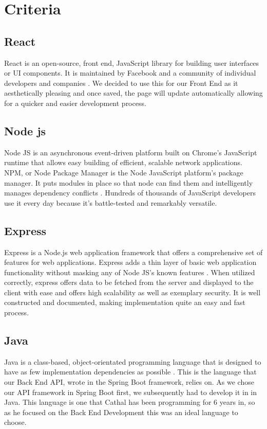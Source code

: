 \section{Criteria}
\subsection{React}
React is an open-source, front end, JavaScript library for building user interfaces or UI components. It is maintained by Facebook and a community of individual developers and companies \cite{React}. We decided to use this for our Front End as it aesthetically pleasing and once saved, the page will update automatically allowing for a quicker and easier development process.

\subsection{Node js}
Node JS is an asynchronous event-driven platform built on Chrome's JavaScript runtime that allows easy building of efficient, scalable network applications. NPM, or Node Package Manager is the Node JavaScript platform's package manager. It puts modules in place so that node can find them and intelligently manages dependency conflicts \cite{NodsJS}. Hundreds of thousands of JavaScript developers use it every day because it's battle-tested and remarkably versatile.

\subsection{Express}
Express is a Node.js web application framework that offers a comprehensive set of features for web applications. Express adds a thin layer of basic web application functionality without masking any of Node JS's known features \cite{ExpressJS}. When utilized correctly, express offers data to be fetched from the server and displayed to the client with ease and offers high scalability as well as exemplary security. It is well constructed and documented, making implementation quite an easy and fast process.

\subsection{Java}
Java is a class-based, object-orientated programming language that is designed to have as few implementation dependencies as possible \cite{Java}. This is the language that our Back End API, wrote in the Spring Boot framework, relies on. As we chose our API framework in Spring Boot first, we subsequently had to develop it in in Java. This language is one that Cathal has been programming for 6 years in, so as he focused on the Back End Development this was an ideal language to choose.

